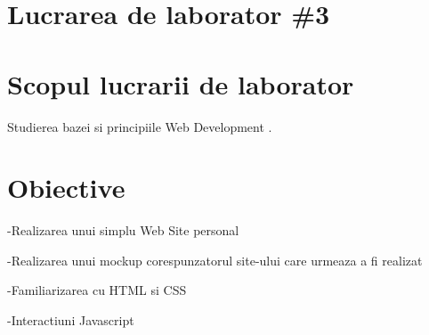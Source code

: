 \section*{Lucrarea de laborator \#3}




\section{Scopul lucrarii de laborator}

Studierea bazei si principiile Web Development  .

\section{Obiective}


   -Realizarea unui simplu Web Site personal

-Realizarea unui mockup corespunzatorul site-ului care urmeaza a fi realizat

-Familiarizarea cu HTML si CSS

-Interactiuni Javascript

